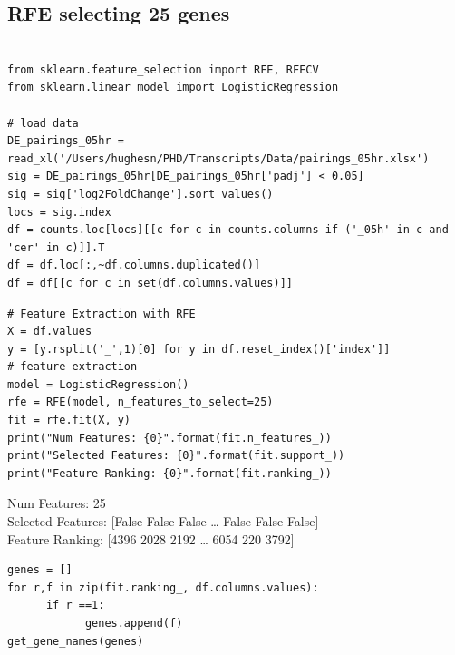\documentclass[11pt]{article}
\begin{document}
\subsection{RFE selecting 25 genes}
\label{sec:org5888335}
\begin{verbatim}

from sklearn.feature_selection import RFE, RFECV
from sklearn.linear_model import LogisticRegression

# load data
DE_pairings_05hr = read_xl('/Users/hughesn/PHD/Transcripts/Data/pairings_05hr.xlsx')
sig = DE_pairings_05hr[DE_pairings_05hr['padj'] < 0.05]
sig = sig['log2FoldChange'].sort_values()
locs = sig.index
df = counts.loc[locs][[c for c in counts.columns if ('_05h' in c and 'cer' in c)]].T
df = df.loc[:,~df.columns.duplicated()]
df = df[[c for c in set(df.columns.values)]]
\end{verbatim}

\begin{verbatim}
# Feature Extraction with RFE
X = df.values
y = [y.rsplit('_',1)[0] for y in df.reset_index()['index']]
# feature extraction
model = LogisticRegression()
rfe = RFE(model, n_features_to_select=25)
fit = rfe.fit(X, y)
print("Num Features: {0}".format(fit.n_features_))
print("Selected Features: {0}".format(fit.support_))
print("Feature Ranking: {0}".format(fit.ranking_))
\end{verbatim}

Num Features: 25\\
Selected Features: [False False False \ldots{} False False False]\\
Feature Ranking: [4396 2028 2192 \ldots{} 6054  220 3792]\\


\begin{verbatim}
genes = []
for r,f in zip(fit.ranking_, df.columns.values):
      if r ==1:
            genes.append(f)
get_gene_names(genes)
\end{verbatim}
\end{document}
